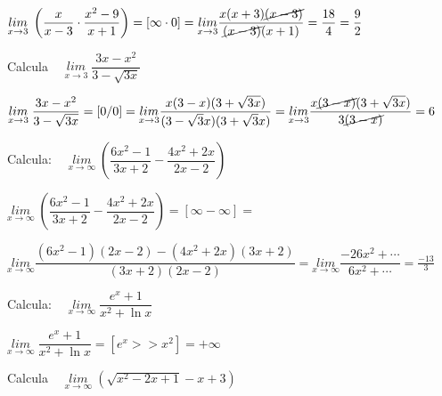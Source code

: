 	\begin{proofw}\renewcommand{\qedsymbol}{$\diamond$}
	
	$\underset {x \to 3}{lim}\; \left({\dfrac {x}{x-3} \cdot \dfrac {x^2-9}{x+1}}\right)=[\infty \cdot 0]= \underset {x\to 3}{lim}{\dfrac {x(x+3)\cancel{(x-3)}}
		{\cancel{(x-3)}(x+1)}}=\dfrac {18} 4=\dfrac 9 2$
	\end{proofw}
	
	\begin{ejre} Calcula $\quad \underset {x \to 3} {lim} \; {\dfrac {3x-x^2}{3-\sqrt {3x}}}$	
	\end{ejre}
	
	\begin{proofw}\renewcommand{\qedsymbol}{$\diamond$}
	
	$\underset {x \to 3} {lim} \; {\dfrac {3x-x^2}{3-\sqrt {3x}}}=[ 0 / 0]= \underset {x \to 3}{lim} { \dfrac {x(3-x)(3+\sqrt{3x})} {(3-\sqrt
	3x)(3+\sqrt
	3x)} }= \underset {x \to 3}{lim} { \dfrac {x\cancel{(3-x)}(3+\sqrt{3x})} {3\cancel{(3-x)}} }=6$	
	\end{proofw} 
	
	\begin{ejre} Calcula: $\quad \underset {x \to \infty}{lim}\; \left( {\dfrac {6x^2-1}{3x+2} - \dfrac {4x^2+2x}{2x-2}} \right)$
		
	\end{ejre}
	
	\begin{proofw}\renewcommand{\qedsymbol}{$\diamond$}

	 $\underset {x \to \infty}{lim}\; \left( {\dfrac {6x^2-1}{3x+2} - \dfrac {4x^2+2x}{2x-2}} \right)=[\infty -\infty]= $
	 
	 $\underset{x\to \infty}{lim}{\dfrac {(6x^2-1)(2x-2)-(4x^2+2x)(3x+2)}{(3x+2)(2x-2)}}=\underset{x\to \infty}{lim}{\dfrac {-26x^2+\cdots}{6x^2+\cdots}}=\frac {-13}{3}$
	\end{proofw}
	
	\begin{ejre} Calcula: $\quad \underset {x \to \infty}{lim}\; {\dfrac {e^x+1}{x^2+\ln x}}$
		
	\end{ejre}
	
	\begin{proofw}\renewcommand{\qedsymbol}{$\diamond$}

	$\underset {x \to \infty}{lim}\; {\dfrac {e^x+1}{x^2+\ln x}}=[e^x>>x^2]=+\infty$
	\end{proofw}
	
	
	\begin{ejre}Calcula $\quad \underset {x \to \infty}{lim}\; {(\sqrt{x^2-2x+1}-x+3)}$
		
	\end{ejre}
	
